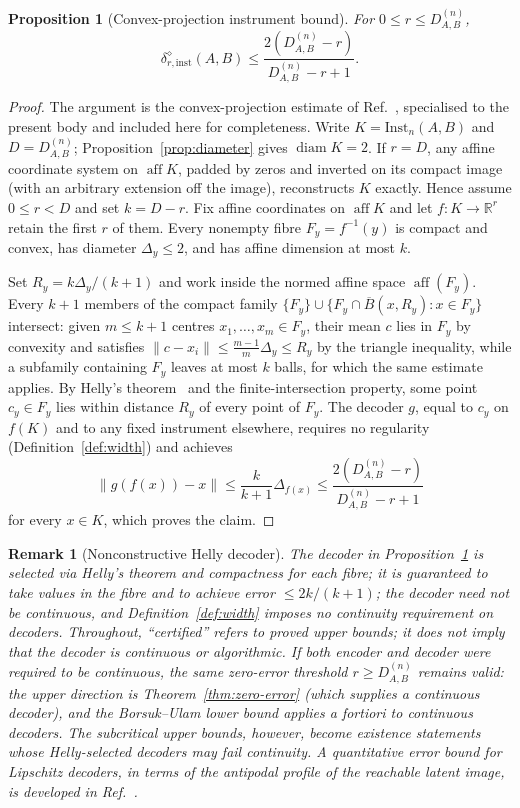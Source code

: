 \documentclass[11pt,a4paper]{article}
\newtheorem{proposition}[theorem]{Proposition}
\newtheorem{remark}[theorem]{Remark}
\newcommand{\Inst}{\mathrm{Inst}}
\newcommand{\diam}{\operatorname{diam}}
\newcommand{\aff}{\operatorname{aff}}
\begin{document}
\begin{proposition}[Convex-projection instrument bound]
\label{prop:convex}
For $0\le r\le D_{A,B}^{(n)}$,
\[
\delta_{r,\mathrm{inst}}^{\diamond}(A,B)
\le\frac{2(D_{A,B}^{(n)}-r)}{D_{A,B}^{(n)}-r+1}.
\]
\end{proposition}

\begin{proof}
The argument is the convex-projection estimate of Ref.~\cite{CompanionChannels}, specialised to the present body and included here for completeness. Write $K=\Inst_n(A,B)$ and $D=D_{A,B}^{(n)}$; Proposition~\ref{prop:diameter} gives $\diam K=2$. If $r=D$, any affine coordinate system on $\aff K$, padded by zeros and inverted on its compact image (with an arbitrary extension off the image), reconstructs $K$ exactly. Hence assume $0\le r<D$ and set $k=D-r$. Fix affine coordinates on $\aff K$ and let $f:K\to\mathbb R^r$ retain the first $r$ of them. Every nonempty fibre $F_y=f^{-1}(y)$ is compact and convex, has diameter $\Delta_y\le2$, and has affine dimension at most $k$.

Set $R_y=k\Delta_y/(k+1)$ and work inside the normed affine space $\aff(F_y)$. Every $k+1$ members of the compact family $\{F_y\}\cup\{F_y\cap\overline B(x,R_y):x\in F_y\}$ intersect: given $m\le k+1$ centres $x_1,\dots,x_m\in F_y$, their mean $c$ lies in $F_y$ by convexity and satisfies $\|c-x_i\|\le\frac{m-1}{m}\Delta_y\le R_y$ by the triangle inequality, while a subfamily containing $F_y$ leaves at most $k$ balls, for which the same estimate applies. By Helly's theorem~\cite{Barvinok2002} and the finite-intersection property, some point $c_y\in F_y$ lies within distance $R_y$ of every point of $F_y$. The decoder $g$, equal to $c_y$ on $f(K)$ and to any fixed instrument elsewhere, requires no regularity (Definition~\ref{def:width}) and achieves
\[
\|g(f(x))-x\|
\le\frac{k}{k+1}\Delta_{f(x)}
\le\frac{2(D_{A,B}^{(n)}-r)}{D_{A,B}^{(n)}-r+1}
\]
for every $x\in K$, which proves the claim.
\end{proof}

\begin{remark}[Nonconstructive Helly decoder]
\label{rem:nonconstructive}
The decoder in Proposition~\ref{prop:convex} is selected via Helly's theorem and compactness for each fibre; it is guaranteed to take values in the fibre and to achieve error $\le2k/(k+1)$; the decoder need not be continuous, and Definition~\ref{def:width} imposes no continuity requirement on decoders. Throughout, ``certified'' refers to proved upper bounds; it does not imply that the decoder is continuous or algorithmic. If both encoder and decoder were required to be continuous, the same zero-error threshold $r\ge D_{A,B}^{(n)}$ remains valid: the upper direction is Theorem~\ref{thm:zero-error} (which supplies a continuous decoder), and the Borsuk--Ulam lower bound applies a fortiori to continuous decoders. The subcritical upper bounds, however, become existence statements whose Helly-selected decoders may fail continuity. A quantitative error bound for Lipschitz decoders, in terms of the antipodal profile of the reachable latent image, is developed in Ref.~\cite{CompanionChannels}.
\end{remark}
\end{document}
